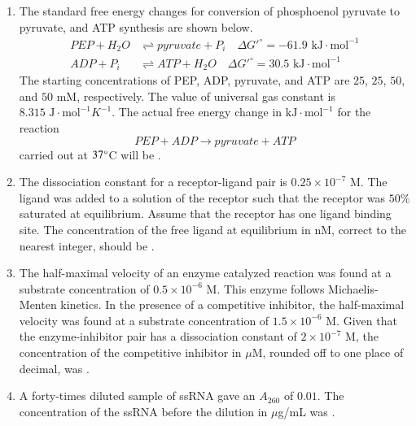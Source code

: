\documentclass[journal,12pt,onecolumn]{IEEEtran}
\theoremstyle{remark}
\begin{document}
\begin{enumerate}
    \item The standard free energy changes for conversion of phosphoenol pyruvate  to pyruvate, and ATP synthesis are shown below.
    \begin{align*}
        PEP + H_2O &\rightleftharpoons pyruvate + P_i \quad \Delta G'^{\circ} = -61.9 \text{ kJ} \cdot \text{mol}^{-1} \\
        ADP + P_i &\rightleftharpoons ATP + H_2O \quad \Delta G'^{\circ} = 30.5 \text{ kJ} \cdot \text{mol}^{-1}
    \end{align*}
    The starting concentrations of PEP, ADP, pyruvate, and ATP are $25$, $25$, $50$, and $50$ mM, respectively. The value of universal gas constant  is $8.315 \text{ J} \cdot \text{mol}^{-1}K^{-1}$. The actual free energy change in $\text{kJ} \cdot \text{mol}^{-1}$ for the reaction
    \[ PEP + ADP \rightarrow pyruvate + ATP \]
    carried out at $37\degree$C will be \underline{\hspace{2cm}} .

    \hfill{}

    \item The dissociation constant for a receptor-ligand pair is $0.25 \times 10^{-7}$ M. The ligand was added to a solution of the receptor such that the receptor was $50\%$ saturated at equilibrium. Assume that the receptor has one ligand binding site. The concentration of the free ligand at equilibrium in nM, correct to the nearest integer, should be \underline{\hspace{2cm}}.

    \hfill{}

    \item The half-maximal velocity of an enzyme catalyzed reaction was found at a substrate concentration of $0.5 \times 10^{-6}$ M. This enzyme follows Michaelis-Menten kinetics. In the presence of a competitive inhibitor, the half-maximal velocity was found at a substrate concentration of $1.5 \times 10^{-6}$ M. Given that the enzyme-inhibitor pair has a dissociation constant of $2 \times 10^{-7}$ M, the concentration of the competitive inhibitor in $\mu$M, rounded off to one place of decimal, was \underline{\hspace{2cm}}.

    \hfill{}

    \item A forty-times diluted sample of ssRNA gave an $A_{260}$ of $0.01$. The concentration of the ssRNA before the dilution in $\mu$g/mL was \underline{\hspace{2cm}} .


\end{enumerate}
\end{document}
